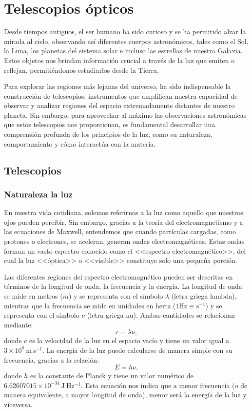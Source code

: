 \chapter{Telescopios ópticos}
Desde tiempos antiguos, el ser humano ha sido curioso y se ha permitido alzar la mirada al cielo, observando así diferentes cuerpos astronómicos, tales como el Sol, la Luna, los planetas del sistema solar e incluso las estrellas de nuestra Galaxia. Estos objetos nos brindan información crucial a través de la luz que emiten o reflejan, permitiéndonos estudiarlos desde la Tierra.

Para explorar las regiones más lejanas del universo, ha sido indispensable la construcción de telescopios; instrumentos que amplifican nuestra capacidad de observar y analizar regiones del espacio extremadamente distantes de nuestro planeta. Sin embargo, para aprovechar al máximo las observaciones astronómicas que estos telescopios nos proporcionan, es fundamental desarrollar una comprensión profunda de los principios de la luz, como su naturaleza, comportamiento y cómo interactúa con la materia.

\section{Telescopios}
\subsection{Naturaleza la luz}
En nuestra vida cotidiana, solemos referirnos a la luz como aquello que nuestros ojos pueden percibir. Sin embargo, gracias a la teoría del electromagnetismo y a las ecuaciones de Maxwell, entendemos que cuando partículas cargadas, como protones o electrones, se aceleran, generan ondas electromagnéticas. Estas ondas forman un vasto espectro conocido como el <<espectro electromagnético>>, del cual la luz <<óptica>> o <<visible>> constituye solo una pequeña porción. 

Las diferentes regiones del espectro electromagnético pueden ser descritas en términos de la longitud de onda, la frecuencia y la energía. La longitud de onda se mide en metros ($ m $) y se representa con el símbolo $ \lambda $ (letra griega lambda), mientras que la frecuencia se mide en unidades en hertz ($ \mathrm{1 Hz \equiv s^{-1}} $) y se representa con el símbolo $\nu$ (letra griega nu). Ambas cantidades se relacionan mediante:
\[ c = \lambda \nu, \]
donde $c$ es la velocidad de la luz en el espacio vacío y tiene un valor igual a $ 3\times 10^8 ~\mathrm{m ~ s^{-1}} $. La energía de la luz puede calcularse de manera simple con su frecuencia, gracias a la relación:
\[ E = h \nu, \]
donde $ h $ es la constante de Planck y tiene un valor numérico de $ 6.62607015\times 10^{-34} ~\mathrm{J~Hz^{-1}} $. Esta ecuación nos indica que a menor frecuencia (o de manera equivalente, a mayor longitud de onda), menor será la energía de la luz y viceversa.

